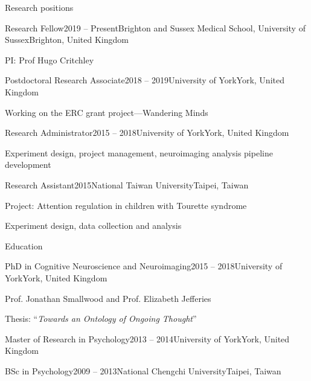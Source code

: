 \documentclass{resume} %
\begin{document}

\begin{rSection}{Research positions}

\begin{rSubsection}{Research Fellow}{2019 -- Present}{Brighton and Sussex Medical School, University of Sussex}{Brighton, United Kingdom}
\item PI: Prof Hugo Critchley
\end{rSubsection}

\begin{rSubsection}{Postdoctoral Research Associate}{2018 -- 2019}{University of York}{York, United Kingdom}
\item Working on the ERC grant project---Wandering Minds
\end{rSubsection}

\begin{rSubsection}{Research Administrator}{2015 -- 2018}{University of York}{York, United Kingdom}
\item Experiment design, project management, neuroimaging analysis pipeline development
\end{rSubsection}

\begin{rSubsection}{Research Assistant}{2015}{National Taiwan University}{Taipei, Taiwan}
\item Project: Attention regulation in children with Tourette syndrome
\item Experiment design, data collection and analysis
\end{rSubsection}

\end{rSection}


\begin{rSection}{Education}

\begin{rSubsection}{PhD in Cognitive Neuroscience and Neuroimaging}{2015 -- 2018}{University of York}{York, United Kingdom}
\item Prof. Jonathan Smallwood and Prof. Elizabeth Jefferies
\item Thesis: ``\textit{Towards an Ontology of Ongoing Thought}''
\end{rSubsection}

\begin{EDUrSubsection}{Master of Research in Psychology}{2013 -- 2014}{University of York}{York, United Kingdom}
\end{EDUrSubsection}

\begin{EDUrSubsection}{BSc in Psychology}{2009 -- 2013}{National Chengchi University}{Taipei, Taiwan}
\end{EDUrSubsection}

\end{rSection}
\end{document}
